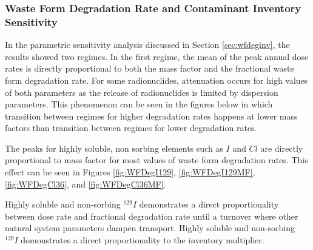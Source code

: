 \subsubsection{Waste Form Degradation Rate and Contaminant Inventory Sensitivity}

In the parametric sensitivity analysis discussed in Section 
\ref{sec:wfdeginv}, the results showed two regimes. In the first regime, 
the mean of the peak annual dose rates is directly proportional to both the mass 
factor and the fractional waste form degradation rate. For some radionuclides, 
attenuation occurs for high values of both parameters as the release of 
radionuclides is limited by dispersion parameters. This phenomenon can be seen 
in the figures below in which transition between regimes for higher degradation 
rates happens at lower mass factors than transition between regimes for lower 
degradation rates. 

The peaks for highly soluble, non sorbing elements such as $I$ and $Cl$
are directly proportional to mass factor for most 
values of waste form degradation rates. This effect can be seen in Figures 
\ref{fig:WFDegI129}, \ref{fig:WFDegI129MF}, \ref{fig:WFDegCl36}, and 
\ref{fig:WFDegCl36MF}. 


Highly soluble and non-sorbing $^{129}I$ demonstrates a direct proportionality between dose rate and 
fractional degradation rate until a turnover where other natural system 
parameters dampen transport. Highly soluble and non-sorbing $^{129}I$ domonstrates a direct 
proportionality to the inventory multiplier.

